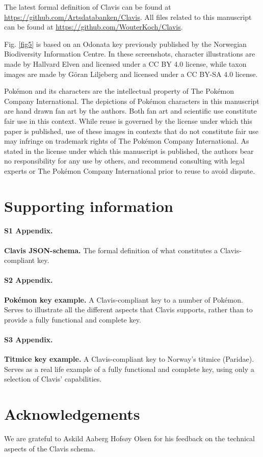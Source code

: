 \documentclass[10pt,letterpaper]{article}
\begin{document}
The latest formal definition of Clavis can be found at \url{https://github.com/Artsdatabanken/Clavis}. All files related to this manuscript can be found at \url{https://github.com/WouterKoch/Clavis}.

Fig. \ref{fig5} is based on an Odonata key previously published by the Norwegian Biodiversity Information Centre. In these screenshots, character illustrations are made by Hallvard Elven and licensed under a CC BY 4.0 license, while taxon images are made by Göran Liljeberg and licensed under a CC BY-SA 4.0 license.

Pokémon and its characters are the intellectual property of The Pokémon Company International. The depictions of Pokémon characters in this manuscript are hand drawn fan art by the authors. Both fan art and scientific use constitute fair use in this context. While reuse is governed by the license under which this paper is published, use of these images in contexts that do not constitute fair use may infringe on trademark rights of The Pokémon Company International. As stated in the license under which this manuscript is published, the authors bear no responsibility for any use by others, and recommend consulting with legal experts or The Pokémon Company International prior to reuse to avoid dispute.

\section*{
Supporting information
}

\paragraph*{S1 Appendix.}
\label{S1_Appendix}
{\bf Clavis JSON-schema.} The formal definition of what constitutes a Clavis-compliant key.

\paragraph*{S2 Appendix.}
\label{S2_Appendix}
{\bf Pokémon key example.} A Clavis-compliant key to a number of Pokémon. Serves to illustrate all the different aspects that Clavis supports, rather than to provide a fully functional and complete key.

\paragraph*{S3 Appendix.}
\label{S3_Appendix}
{\bf Titmice key example.} A Clavis-compliant key to Norway's titmice (Paridae). Serves as a real life example of a fully functional and complete key, using only a selection of Clavis' capabilities.

\section*{
Acknowledgements
}
We are grateful to Askild Aaberg Hofsøy Olsen for his feedback on the technical aspects of the Clavis schema. 
\nolinenumbers

\end{document}
